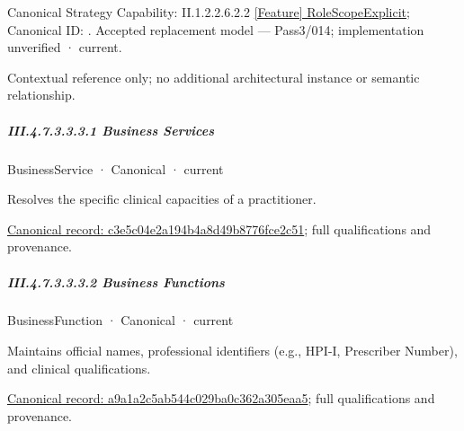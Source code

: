 {\small Canonical Strategy Capability: II.1.2.2.6.2.2 \hyperref[element:1541d71b5c924ed49e618f2496011c81]{[Feature] RoleScopeExplicit}; Canonical ID: \texttt{}. Accepted replacement model — Pass3/014; implementation unverified · current.}\par
Contextual reference only; no additional architectural instance or semantic relationship.\par
\subparagraph*{III.4.7.3.3.3.1 Business Services}
\label{navigation:III.4.7.3.3.3.1}

\label{navigation:III.4.7.3.3.3.1.1}

\label{element:c3e5c04e2a194b4a8d49b8776fce2c51}
{\small BusinessService · Canonical · current}\par

Resolves the specific clinical capacities of a practitioner.


{\footnotesize \href{../../../../continuum/business/business-service/c3e5c04e2a194b4a8d49b8776fce2c51.md}{Canonical record: c3e5c04e2a194b4a8d49b8776fce2c51}; full qualifications and provenance.}\par
\subparagraph*{III.4.7.3.3.3.2 Business Functions}
\label{navigation:III.4.7.3.3.3.2}

\label{navigation:III.4.7.3.3.3.2.1}

\label{element:a9a1a2c5ab544c029ba0c362a305eaa5}
{\small BusinessFunction · Canonical · current}\par

Maintains official names, professional identifiers (e.g., HPI-I, Prescriber Number), and clinical qualifications.


{\footnotesize \href{../../../../continuum/business/business-function/a9a1a2c5ab544c029ba0c362a305eaa5.md}{Canonical record: a9a1a2c5ab544c029ba0c362a305eaa5}; full qualifications and provenance.}\par
{}
\label{navigation:III.4.7.3.3.3.2.2}

